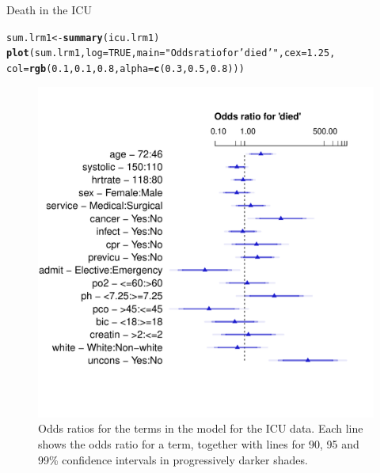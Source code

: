 \documentclass[11pt]{book}\usepackage[]{graphicx}\usepackage[]{color}
\makeatletter
\newcommand{\hlnum}[1]{\textcolor[rgb]{0.686,0.059,0.569}{#1}}%
\newcommand{\hlstr}[1]{\textcolor[rgb]{0.192,0.494,0.8}{#1}}%
\newcommand{\hlstd}[1]{\textcolor[rgb]{0.345,0.345,0.345}{#1}}%
\newcommand{\hlkwb}[1]{\textcolor[rgb]{0.69,0.353,0.396}{#1}}%
\newcommand{\hlkwc}[1]{\textcolor[rgb]{0.333,0.667,0.333}{#1}}%
\newcommand{\hlkwd}[1]{\textcolor[rgb]{0.737,0.353,0.396}{\textbf{#1}}}%
\newenvironment{kframe}{%
 \def\at@end@of@kframe{}%
 \ifinner\ifhmode%
  \def\at@end@of@kframe{\end{minipage}}%
  \begin{minipage}{\columnwidth}%
 \fi\fi%
 \def\FrameCommand##1{\hskip\@totalleftmargin \hskip-\fboxsep
 \colorbox{shadecolor}{##1}\hskip-\fboxsep
     \hskip-\linewidth \hskip-\@totalleftmargin \hskip\columnwidth}%
 \MakeFramed {\advance\hsize-\width
   \@totalleftmargin\z@ \linewidth\hsize
   \@setminipage}}%
 {\par\unskip\endMakeFramed%
 \at@end@of@kframe}
\newenvironment{knitrout}{}{} %
\renewenvironment{knitrout}{\small\renewcommand{\baselinestretch}{.85}}{} %
\makeatother
\begin{document}
\begin{Example}[icu1]{Death in the ICU}
\begin{knitrout}
\color{fgcolor}\begin{kframe}
\begin{alltt}
\hlstd{sum.lrm1} \hlkwb{<-} \hlkwd{summary}\hlstd{(icu.lrm1)}
\hlkwd{plot}\hlstd{(sum.lrm1,} \hlkwc{log}\hlstd{=}\hlnum{TRUE}\hlstd{,} \hlkwc{main}\hlstd{=}\hlstr{"Odds ratio for 'died'"}\hlstd{,} \hlkwc{cex}\hlstd{=}\hlnum{1.25}\hlstd{,}
     \hlkwc{col} \hlstd{=} \hlkwd{rgb}\hlstd{(}\hlnum{0.1}\hlstd{,} \hlnum{0.1}\hlstd{,} \hlnum{0.8}\hlstd{,} \hlkwc{alpha} \hlstd{=} \hlkwd{c}\hlstd{(}\hlnum{0.3}\hlstd{,} \hlnum{0.5}\hlstd{,} \hlnum{0.8}\hlstd{)))}
\end{alltt}
\end{kframe}
\end{knitrout}


\begin{figure}[!htb]
 \centering
 \includegraphics[width=.7\textwidth]{ch07/fig/icu-odds-ratios-cropped}
 \caption{Odds ratios for the terms in the model for the ICU data. Each line shows the odds ratio for a term, together with lines for 90, 95 and 99\% confidence intervals in progressively darker shades.}
 \label{fig:icu1-odds-ratios}
\end{figure}


\end{Example}
\end{document}
